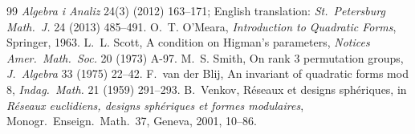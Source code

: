 \documentclass[11pt]{article}
\theoremstyle{definition}
\theoremstyle{remark}
\begin{document}
\begin{thebibliography}{99}
\emph{Algebra i Analiz} 24(3) (2012) 163--171; English translation:
\emph{St.\ Petersburg Math.\ J.} 24 (2013) 485--491.
 O.~T. O'Meara, \emph{Introduction to Quadratic Forms},
Springer, 1963.
 L.~L. Scott, A condition on Higman's parameters, \emph{Notices
Amer.\ Math.\ Soc.} 20 (1973) A-97.
 M.~S. Smith, On rank $3$ permutation groups, \emph{J.\
Algebra} 33 (1975) 22--42.
 F.~van der Blij, An invariant of quadratic forms mod $8$,
\emph{Indag.\ Math.} 21 (1959) 291--293.
 B.~Venkov, R\'eseaux et designs sph\'eriques, in
\emph{R\'eseaux euclidiens, designs sph\'eriques et formes modulaires},
Monogr.\ Enseign.\ Math.\ 37, Geneva, 2001, 10--86.
\end{thebibliography}
\end{document}

